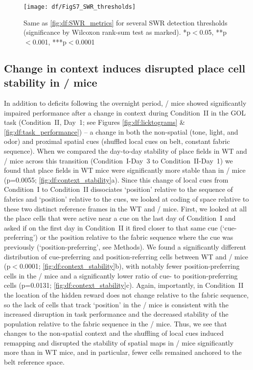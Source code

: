 \begin{figure}
	\centering
	\texttt{[image: df/FigS7\_SWR\_thresholds]}
	\caption[SWR properties at multiple thresholds]{Same as \autoref{fig:df:SWR_metrics} for several SWR detection thresholds (significance by Wilcoxon rank-sum test as marked). *p$<$0.05, **p$<$0.001, ***p$<$0.0001}
	\label{fig:df:SWR_thresholds}
\end{figure}

\subsection{Change in context induces disrupted place cell stability in \df/ mice}
\label{sec:df:results:context}
In addition to deficits following the overnight period, \df/ mice showed significantly impaired performance after a change in context during Condition~II in the GOL task (Condition~II, Day~1; see Figures \ref{fig:df:licktograms} \& \ref{fig:df:task_performance}) -- a change in both the non-spatial (tone, light, and odor) and proximal spatial cues (shuffled local cues on belt, constant fabric sequence). When we compared the day-to-day stability of place fields in WT and \df/ mice across this transition (Condition~I-Day~3 to Condition~II-Day~1) we found that place fields in WT mice were significantly more stable than in \df/ mice (p=0.0055; \autoref{fig:df:context_stability}a). Since this change of local cues from Condition~I to Condition~II dissociates `position' relative to the sequence of fabrics and `position' relative to the cues, we looked at coding of space relative to these two distinct reference frames in the WT and \df/ mice. First, we looked at all the place cells that were active near a cue on the last day of Condition~I and asked if on the first day in Condition~II it fired closer to that same cue (`cue-preferring') or the position relative to the fabric sequence where the cue was previously (`position-preferring', see Methods). We found a significantly different distribution of cue-preferring and position-referring cells between WT and \df/ mice (p$<$0.0001; \autoref{fig:df:context_stability}b), with notably fewer position-preferring cells in the \df/ mice and a significantly lower ratio of cue- to position-preferring cells (p=0.0131; \autoref{fig:df:context_stability}c). Again, importantly, in Condition~II the location of the hidden reward does not change relative to the fabric sequence, so the lack of cells that track `position' in the \df/ mice is consistent with the increased disruption in task performance and the decreased stability of the population relative to the fabric sequence in the \df/ mice. Thus, we see that changes to the non-spatial context and the shuffling of local cues induced remapping and disrupted the stability of spatial maps in \df/ mice significantly more than in WT mice, and in particular, fewer cells remained anchored to the belt reference space.

